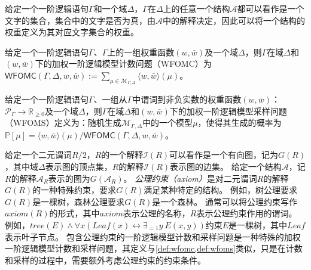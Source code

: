 \documentclass[12pt,UTF8,AutoFakeBold=3,a4paper]{ctexart} %
\newcommand{\sentence}{\Gamma}
\newcommand{\weight}{w}
\newcommand{\negweight}{\bar{w}}
\newcommand{\wfomc}{WFOMC}
\newcommand{\symwfomc}{\ensuremath{\mathsf{WFOMC}}}
\newcommand{\domain}{\Delta}
\newcommand{\real}{\mathbb{R}}
\newcommand{\pro}{\mathbb{P}}
\newcommand{\fomodels}[2]{\mathcal{M}_{#1, #2}}
\newcommand{\structure}{\mathcal{A}}
\newcommand{\typeweight}[1]{\langle \weight, \negweight\rangle(#1)}
\begin{document}
给定一个一阶逻辑语句$\sentence$和一个域$\domain$，$\sentence$在$\domain$上的任意一个结构$\structure$都可以看作是一个文字的集合，集合中的文字是否为真，由$\structure$中的解释决定，因此可以将一个结构的权重定义为其对应文字集合的权重。

\begin{definition}\label{def:wfomc}
	给定一个一阶逻辑语句$\sentence$、$\sentence$上的一组权重函数$(\weight, \negweight)$及一个域$\domain$，则$\sentence$在域$\domain$和$(\weight, \negweight)$下的加权一阶逻辑模型计数问题（\wfomc）为$\symwfomc(\sentence, \domain, \weight, \negweight) := \sum_{\mu\in\fomodels{\sentence}{\domain}}\typeweight{\mu}$。
\end{definition}
\begin{definition}
\label{def:wfoms}
	给定一个一阶逻辑语句$\sentence$、一组从$\sentence$中谓词到非负实数的权重函数$(\weight, \negweight)$：$\mathcal{P}_\sentence\to\real_{\ge 0}$及一个域$\domain$，则$\sentence$在域$\domain$和$(\weight, \negweight)$下的加权一阶逻辑模型采样问题（WFOMS）定义为：随机生成$\fomodels{\sentence}{\domain}$中的一个模型$\mu$，使得其生成的概率为$\pro[\mu] = \typeweight{\mu}/\symwfomc(\sentence, \domain, \weight, \negweight)$。
\end{definition}

给定一个二元谓词$R/2$，$R$的一个解释$\mathcal{I}(R)$可以看作是一个有向图，记为$G(R)$，其中域$\domain$表示图的顶点集，$R$的解释$\mathcal{I}(R)$表示图的边集。
给定一个结构$\structure$，记$R$的解释$\structure_R$表示的图为$G(\structure_R)$。
\emph{公理约束（axiom）}是对二元谓词$R$的解释$G(R)$的一种特殊约束，要求$G(R)$满足某种特定的结构。
例如，树公理要求$G(R)$是一棵树，森林公理要求$G(R)$是一个森林。
通常可以将公理约束写作$axiom(R)$的形式，其中$axiom$表示公理的名称，$R$表示公理约束作用的谓词。
例如，$tree(E) \land \forall x \left( Leaf(x)\leftrightarrow \exists_{=1} y \ E(x,y) \right)$约束$E$是一棵树，其中$Leaf$表示叶子节点。
包含公理约束的一阶逻辑模型计数和采样问题是一种特殊的加权一阶逻辑模型计数和采样问题，其定义与\cref{def:wfomc,def:wfoms}类似，只是在计数和采样的过程中，需要额外考虑公理约束的约束条件。

\end{document}
